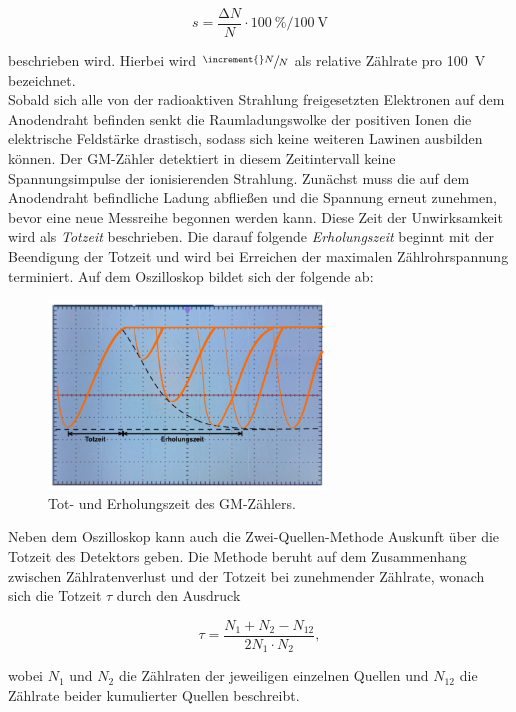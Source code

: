 \begin{equation}
\label{eqn:mPlateau}
    s = \frac{\increment{}N}{N}\cdot{}\qty{100}{\percent} / \qty{100}{\volt}
\end{equation}

\noindent beschrieben wird. Hierbei wird $\sfrac{\increment{}N}{N}$ als relative Zählrate pro \qty{100}{\volt} bezeichnet.\\

\noindent Sobald sich alle von der radioaktiven Strahlung freigesetzten Elektronen auf dem Anodendraht befinden senkt die 
Raumladungswolke der positiven Ionen die elektrische Feldstärke drastisch, sodass sich keine weiteren Lawinen ausbilden können.
Der GM-Zähler detektiert in diesem Zeitintervall keine Spannungsimpulse der ionisierenden Strahlung. Zunächst muss die auf dem 
Anodendraht befindliche Ladung abfließen und die Spannung erneut zunehmen, bevor eine neue Messreihe begonnen werden kann. Diese 
Zeit der Unwirksamkeit wird als \emph{Totzeit} beschrieben. Die darauf folgende \emph{Erholungszeit} beginnt mit der 
Beendigung der Totzeit und wird bei Erreichen der maximalen Zählrohrspannung terminiert. Auf dem Oszilloskop bildet sich der 
folgende ab:

\begin{figure}[H]
    \centering
    \includegraphics[height=5cm]{content/Totzeit.png}
    \caption{Tot- und Erholungszeit des GM-Zählers\cite{Versuchsanleitung_v703}.}
    \label{fig:Totzeit}
\end{figure}

\noindent Neben dem Oszilloskop kann auch die Zwei-Quellen-Methode Auskunft über die Totzeit des Detektors geben.
Die Methode beruht auf dem Zusammenhang zwischen Zählratenverlust und der Totzeit bei zunehmender Zählrate, wonach 
sich die Totzeit $\tau$ durch den Ausdruck 

\begin{equation}
\label{eqn:Totzeit}
    \tau = \frac{N_1 + N_2 - N_{12}}{2 N_1 \cdot N_2},
\end{equation}

\noindent wobei $N_1$ und $N_2$ die Zählraten der jeweiligen einzelnen Quellen und $N_{12}$ die Zählrate beider kumulierter Quellen 
beschreibt.

%
